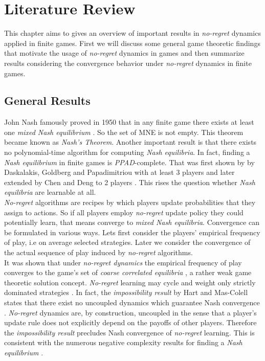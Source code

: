 
\chapter{Literature Review}\label{chapter:literatureReview}

This chapter aims to gives an overview of important results in \textit{no-regret} dynamics applied in finite games. First we will discuss some general game theoretic findings that motivate the usage of \textit{no-regret} dynamics in games and then summarize results considering the convergence behavior under \textit{no-regret} dynamics in finite games. \\

\section{General Results}\label{section:generalResults}

John Nash famously proved in 1950 that in any finite game there exists at least one \textit{mixed Nash equilibrium} \cite{nash}. So the set of MNE is not empty. This theorem became known as \textit{Nash's Theorem}. Another important result is that there exists no polynomial-time algorithm for computing \textit{Nash equilibria}. In fact,  finding a \textit{Nash equilibrium} in finite games is \textit{PPAD}-complete. That was first shown by by Daskalakis, Goldberg and Papadimitriou  with at least 3 players \cite{daskalakis} and later extended by Chen and Deng to 2 players \cite{chen}. This rises the question whether \textit{Nash equilibria} are learnable at all. \\

\textit{No-regret} algorithms are recipes by which players update probabilities that they assign to actions. So if all players employ \textit{no-regret} update policy they could potentially learn, that means converge to \textit{mixed Nash equilibria}.  Convergence can be formulated in various ways. Lets first consider the players' empirical frequency of play, i.e on average selected strategies. Later we consider the convergence of the actual sequence of play induced by \textit{no-regret} algorithms.\\

It was shown that under \textit{no-regret dynamics} the empirical frequency of play converges to the game's set of \textit{coarse correlated equilibria} \cite{flokas}, a rather weak game theoretic solution concept. \textit{No-regret} learning may cycle and weight only strictly dominated strategies \cite{mertikopoulos}. In fact, the \textit{impossibility result} by Hart and Mas-Colell states that there exist no uncoupled dynamics which guarantee Nash convergence \cite{hart}. \textit{No-regret} dynamics are, by construction, uncoupled in the sense that a player’s update rule does not explicitly depend on the payoffs of other players. Therefore the \textit{impossibility result} precludes Nash convergence of \textit{no-regret} learning. This is consistent with the numerous negative complexity results for finding a \textit{Nash equilibrium} \cite{chen, daskalakis}. \\

